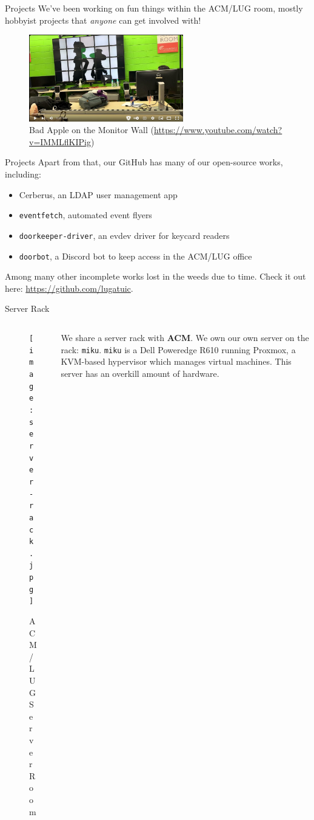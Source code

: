 \documentclass{beamer}
\begin{document}
\begin{frame}{Projects}
	We've been working on fun things within the ACM/LUG room, mostly
	hobbyist projects that \textit{anyone} can get involved with!
	\pause
	\begin{figure}
		\centering
		\includegraphics[width=0.60\textwidth]{bad-apple.png}
		\caption{Bad Apple on the Monitor Wall
		(\url{https://www.youtube.com/watch?v=IMMLflKIPig})}
	\end{figure}
\end{frame}

\begin{frame}{Projects}
	Apart from that, our GitHub has many of our open-source works,
	including:
	\pause
	\begin{itemize}
		\item Cerberus, an LDAP user management app
			\pause
		\item \texttt{eventfetch}, automated event flyers
			\pause
		\item \texttt{doorkeeper-driver}, an evdev driver for keycard
			readers
			\pause
		\item \texttt{doorbot}, a Discord bot to keep access in the
			ACM/LUG office
			\pause
	\end{itemize}
	Among many other incomplete works lost in the weeds due to time. Check
	it out here: \url{https://github.com/lugatuic}.
\end{frame}

\begin{frame}{Server Rack}
	\begin{columns}
		\begin{column}{0.4\textwidth}
			\begin{figure}
				\centering
				\texttt{[image: server-rack.jpg]}
				\caption{ACM/LUG Server Room}
			\end{figure}
		\end{column}
		\begin{column}{0.6\textwidth}
			We share a server rack with \textbf{ACM}. \pause We own
			our own server on the rack: \texttt{miku}.
			\texttt{miku} is a Dell Poweredge R610 running Proxmox,
			a KVM-based hypervisor which manages virtual machines.
			This server has an overkill amount of hardware.
		\end{column}
	\end{columns}
\end{frame}
\end{document}
